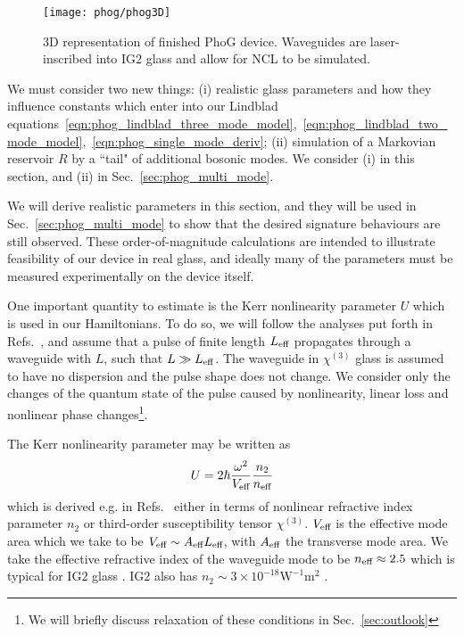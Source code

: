 \begin{figure}[htp]
\centering
\texttt{[image: phog/phog3D]}
\caption{\label{fig:phog_realistic} $3$D representation of finished PhoG device. Waveguides are laser-inscribed into IG$2$ glass and allow for NCL to be simulated.}
\end{figure}

We must consider two new things: (i) realistic glass parameters and how they influence constants which enter into our Lindblad equations~\ref{eqn:phog_lindblad_three_mode_model},~\ref{eqn:phog_lindblad_two_mode_model},~\ref{eqn:phog_single_mode_deriv}; (ii) simulation of a Markovian reservoir $R$ by a ``tail" of additional bosonic modes. We consider (i) in this section, and (ii) in Sec.~\ref{sec:phog_multi_mode}.

We will derive realistic parameters in this section, and they will be used in Sec.~\ref{sec:phog_multi_mode} to show that the desired signature behaviours are still observed. These order-of-magnitude calculations are intended to illustrate feasibility of our device in real glass, and ideally many of the parameters must be measured experimentally on the device itself.

One important quantity to estimate is the Kerr nonlinearity parameter $U$ which is used in our Hamiltonians. To do so, we will follow the analyses put forth in Refs.~\cite{Drummond1980, Imoto1985, Kitagawa1986}, and assume that a pulse of finite length $L_{\text{eff}}$ propagates through a waveguide with $L$, such that $L \gg L_{\text{eff}}$. The waveguide in $\chi^{\left(3\right)}$ glass is assumed to have no dispersion and the pulse shape does not change. We consider only the changes of the quantum state of the pulse caused by nonlinearity, linear loss and nonlinear phase changes\footnote{We will briefly discuss relaxation of these conditions in Sec.~\ref{sec:outlook}}. %

The Kerr nonlinearity parameter may be written as 
\begin{equation}
U = 2 \hbar \frac{\omega^2}{V_{\text{eff}}} \frac{n_2}{n_{\text{eff}}}
\end{equation}
which is derived e.g. in Refs.~\cite{Imoto1985, Kitagawa1986, Drummond1980} either in terms of nonlinear refractive index parameter $n_2$ or third-order susceptibility tensor $\chi^{\left(3\right)}$. $V_{\text{eff}}$ is the effective mode area which we take to be $V_{\text{eff}} \sim A_{\text{eff}} L_{\text{eff}}$, with $A_{\text{eff}}$ the transverse mode area. We take the effective refractive index of the waveguide mode to be $n_{\text{eff}} \approx 2.5$ which is typical for IG$2$ glass \cite{ig2}. IG$2$ also has $n_2 \sim 3 \times 10^{-18} \text{W}^{-1} \text{m}^2$ \cite{Demetriou2017, Wang2014}. %

